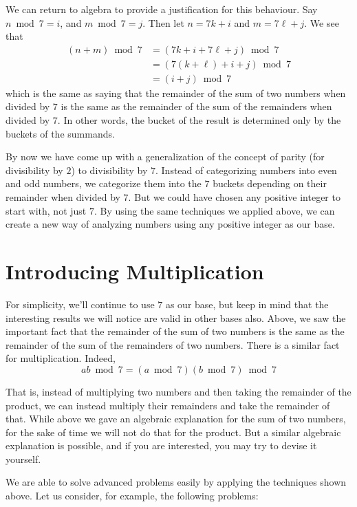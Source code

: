 \documentclass[a4paper,10pt]{report}
\begin{document}
We can return to algebra to provide a justification for this behaviour. Say
$n \bmod 7 = i$, and $m \bmod 7 = j$. Then let $n = 7k + i$ and $m = 7\ell + j$.
We see that \begin{align*}
 (n + m) \bmod 7
 &= (7k+i + 7\ell+j) \bmod 7 \\
 &= (7(k+\ell) + i + j) \bmod 7 \\
 &= (i + j) \bmod 7
\end{align*} which is the same as saying that the remainder of the sum of two
numbers when divided by $7$ is the same as the remainder of the sum of the
remainders when divided by $7$. In other words, the bucket of the result is
determined only by the buckets of the summands.

By now we have come up with a generalization of the concept of parity (for
divisibility by $2$) to divisibility by $7$. Instead of categorizing numbers
into even and odd numbers, we categorize them into the $7$ buckets depending on
their remainder when divided by $7$. But we could have chosen any positive
integer to start with, not just $7$. By using the same techniques we applied
above, we can create a new way of analyzing numbers using any positive integer
as our base.

\section{Introducing Multiplication}

For simplicity, we'll continue to use $7$ as our base, but keep in mind that the
interesting results we will notice are valid in other bases also. Above, we saw
the important fact that the remainder of the sum of two numbers is the same as
the remainder of the sum of the remainders of two numbers. There is a similar
fact for multiplication. Indeed, \[
 ab \bmod 7 = (a \bmod 7)(b \bmod 7) \bmod 7
\]

That is, instead of multiplying two numbers and then taking the remainder of the
product, we can instead multiply their remainders and take the remainder of
that. While above we gave an algebraic explanation for the sum of two numbers,
for the sake of time we will not do that for the product. But a similar
algebraic explanation is possible, and if you are interested, you may try to
devise it yourself.

We are able to solve advanced problems easily by applying the techniques shown
above. Let us consider, for example, the following problems:
\end{document}
